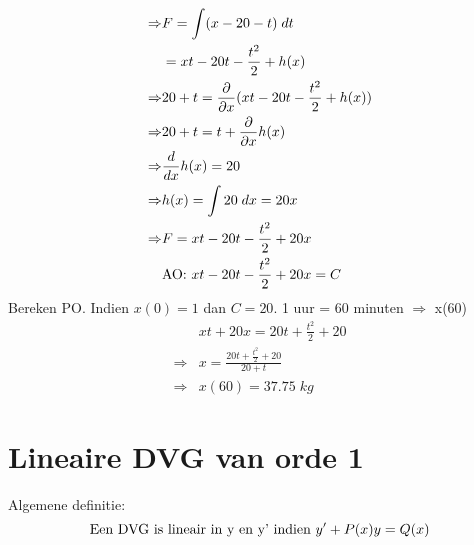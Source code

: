 {\begin{equation*}
\begin{split}
        \Rightarrow & F = \int( x- 20 - t)\; dt \\
                    & = xt - 20t - \frac{t^2}{2} + h(x) \\
        \Rightarrow & 20 + t = \frac{\partial}{\partial x}(xt - 20t - \frac{t^2}{2} + h(x)) \\
        \Rightarrow & 20 +t = t + \frac{\partial}{\partial x}h(x) \\
        \Rightarrow & \frac{d}{d x}h(x) = 20 \\
        \Rightarrow & h(x) = \int 20\;dx = 20x \\
        \Rightarrow & F = xt - 20t - \frac{t^2}{2} + 20x \\
        & \hbox{AO: } xt - 20t - \frac{t^2}{2} + 20x = C
     \end{split}
    \end{equation*}
    Bereken PO. Indien $x(0) = 1$ dan $C = 20$. 1 uur = 60 minuten $\Rightarrow$ x(60)
    \begin{equation*}
     \begin{split}
      & xt + 20x = 20t + \frac{t^2}{2} + 20 \\
      \Rightarrow & x = \frac{20t + \frac{t^2}{2} + 20}{20 + t} \\
      \Rightarrow & x(60) = 37.75\; kg
     \end{split}
    \end{equation*}

    
}


\section{Lineaire DVG van orde 1}
Algemene definitie:
$$\hbox{Een DVG is lineair in y en y' indien } y' + P(x)y = Q(x)$$
